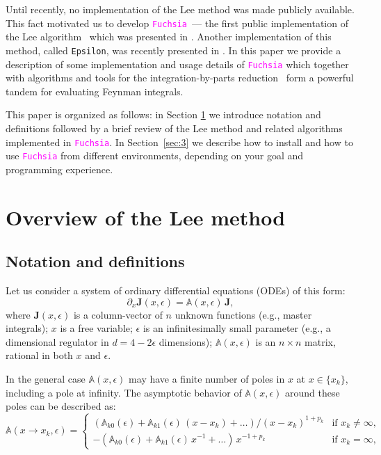 \documentclass{elsarticle}
\newcommand{\eps}{\epsilon}
\newcommand{\fuchsia}{\textcolor{fuchsia}{\texttt{Fuchsia}}\xspace}
\newcommand{\M}[1]{\mathbb{#1}} %
\newcommand{\V}[1]{\mathbf{#1}} %
\begin{document}
Until recently, no implementation of the Lee method was made publicly available.
This fact motivated us to develop \fuchsia \ --- the first public implementation of the Lee algorithm~\cite{Lee15} which was presented in \cite{GM16}.
Another implementation of this method, called \texttt{Epsilon}, was recently presented in \cite{Pra17}.
In this paper we provide a description of some implementation and usage details of \fuchsia which together with algorithms and tools for the integration-by-parts reduction~\cite{Lap00,Smi08,MS12,Lee12,Lee13,SS13,Smi14,GLZ16} form a powerful tandem for evaluating Feynman integrals.

This paper is organized as follows: in Section \ref{sec:2} we introduce notation and definitions followed by a brief review of the Lee method and related algorithms implemented in \fuchsia.
In Section~\ref{sec:3} we describe how to install and how to use \fuchsia from different environments, depending on your goal and programming experience.


\section{Overview of the Lee method}
\label{sec:2}

\subsection{Notation and definitions}

Let us consider a system of ordinary differential equations (ODEs) of this form:
\begin{equation}
\label{eq:dj}
    \partial_x \V J(x,\eps) = \M A(x,\eps)\,\V J,
\end{equation}
where $\V J(x,\eps)$ is a column-vector of $n$ unknown functions (e.g., master integrals);
$x$ is a free variable;
$\eps$ is an infinitesimally small parameter (e.g., a dimensional regulator in $d=4-2\eps$ dimensions);
$\M A(x,\eps)$ is an $n \times n$ matrix, rational in both $x$ and $\eps$.

In the general case $\M A(x,\eps)$ may have a finite number of poles in $x$ at $x\in\{x_k\}$, including a pole at infinity.
The asymptotic behavior of $\M A(x,\eps)$ around these poles can be described as:
\begin{equation}
\label{eq:axeps}
    \M A(x \to x_k,\eps) =
    \begin{cases}
        (\M A_{k0}(\eps) + \M A_{k1}(\eps)\,(x - x_k) + \dots)/(x - x_k)^{1+p_k} & \text{if $x_k\neq\infty$}, \\
        -(\M A_{k0}(\eps) + \M A_{k1}(\eps)\,x^{-1} + \dots)\,x^{-1 + p_k} & \text{if $x_k=\infty$},
    \end{cases}
\end{equation}
\end{document}
